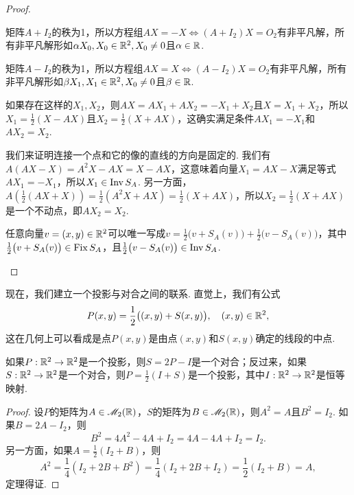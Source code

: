 \begin{proof}
  \begin{inparaenum}[(a)]
    \item 矩阵$A+I_2$的秩为1，所以方程组$AX=-X\Leftrightarrow(A+I_2)X=O_2$有非平凡解，所有非平凡解形如$\alpha X_0,X_0\in\mathbb R^2,X_0\ne0$且$\alpha\in\mathbb R$.

    \item 矩阵$A-I_2$的秩为1，所以方程组$AX=X\Leftrightarrow(A-I_2)X=O_2$有非平凡解，所有非平凡解形如$\beta X_1,X_1\in\mathbb R^2,X_0\ne0$且$\beta\in\mathbb R$.

    \item 如果存在这样的$X_1,X_2$，则$AX=AX_1+AX_2=-X_1+X_2$且$X=X_1+X_2$，所以$X_1=\frac12(X-AX)$且$X_2=\frac12(X+AX)$，这确实满足条件$AX_1=-X_1$和$AX_2=X_2$.

    \item 我们来证明连接一个点和它的像的直线的方向是固定的. 我们有$A(AX-X)=A^2X-AX=X-AX$，这意味着向量$X_1=AX-X$满足等式$AX_1=-X_1$，所以$X_1\in \operatorname{Inv} S_A$. 另一方面，$A\left(\frac12(AX+X)\right)=\frac12(A^2X+AX)
        =\frac12(X+AX)$，所以$X_2=\frac12(X+AX)$是一个不动点，即$AX_2=X_2$.

    \item 任意向量$v=(x,y)\in\mathbb R^2$可以唯一写成$v=
    \frac12\big(v+S_A(v)\big)+\frac12\big(v-S_A(v)\big)$，其中$\frac12\big(v+S_A(v)\big)\in\operatorname{Fix} S_A$，且$
    \frac12\big(v-S_A(v)\big)\in\operatorname{Inv} S_A$.
  \end{inparaenum}
\end{proof}

现在，我们建立一个投影与对合之间的联系. 直觉上，我们有公式
\[
  P(x,y) = \frac12 \big( (x,y) + S(x,y) \big), \quad (x,y) \in \mathbb R^2,
\]
这在几何上可以看成是点$P(x,y)$是由点$(x,y)$和$S(x,y)$确定的线段的中点.

\begin{mybox}
  \begin{theorem}[投影与对合之间的联系.]

    如果$P:\mathbb R^2\to\mathbb R^2$是一个投影，则$S=2P-I$是一个对合；反过来，如果$S:\mathbb R^2\to\mathbb R^2$是一个对合，则$P=\frac12(I+S)$是一个投影，其中$I:\mathbb R^2\to\mathbb R^2$是恒等映射.
  \end{theorem}
\end{mybox}

\begin{proof}
  设$P$的矩阵为$A\in\mathscr M_2(\mathbb R)$，$S$的矩阵为$B\in\mathscr M_2(\mathbb R)$，则$A^2=A$且$B^2=I_2$. 如果$B=2A-I_2$，则
  \[
    B^2 = 4A^2 - 4A + I_2 = 4A - 4A + I_2 = I_2.
  \]
  另一方面，如果$A=\frac12(I_2+B)$，则
  \[
    A^2 = \frac14(I_2 + 2B + B^2) = \frac14(I_2 + 2B + I_2) = \frac12(I_2 + B) = A,
  \]
  定理得证.
\end{proof}
